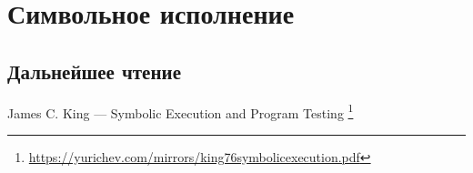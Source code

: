 \section{Символьное исполнение}




\subsection{Дальнейшее чтение}

James C. King --- Symbolic Execution and Program Testing
\footnote{\url{https://yurichev.com/mirrors/king76symbolicexecution.pdf}}

